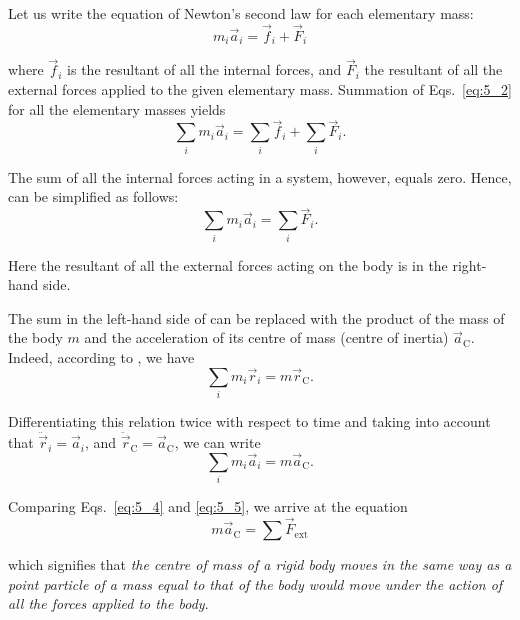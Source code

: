 Let us write the equation of Newton's second law for each elementary mass:
\begin{equation}\label{eq:5_2}
m_i\vec{a}_i = \vec{f}_i + \vec{F}_i
\end{equation}

\noindent
where $\vec{f}_i$ is the resultant of all the internal forces, and $\vec{F}_i$ the resultant of all the external forces applied to the given elementary mass. Summation of Eqs.~\eqref{eq:5_2} for all the elementary masses yields
\begin{equation}\label{eq:5_3}
	\sum_i m_i\vec{a}_i = \sum_i \vec{f}_i + \sum_i \vec{F}_i.
\end{equation}

\noindent
The sum of all the internal forces acting in a system, however, equals zero. Hence,  can be simplified as follows:
\begin{equation}\label{eq:5_4}
	\sum_i m_i\vec{a}_i = \sum_i \vec{F}_i.
\end{equation}

\noindent
Here the resultant of all the external forces acting on the body is in the right-hand side.

The sum in the left-hand side of  can be replaced with the product of the mass of the body $m$ and the acceleration of its centre of mass (centre of inertia) $\vec{a}_{\text{C}}$. Indeed, according to , we have
\begin{equation*}
	\sum_i m_i\vec{r}_i = m \vec{r}_{\text{C}}.
\end{equation*}

\noindent
Differentiating this relation twice with respect to time and taking into account that $\ddot{\vec{r}}_i=\vec{a}_i$, and $\ddot{\vec{r}}_{\text{C}}=\vec{a}_{\text{C}}$, we can write
\begin{equation}\label{eq:5_5}
	\sum_i m_i\vec{a}_i = m \vec{a}_{\text{C}}.
\end{equation}

Comparing Eqs.~\eqref{eq:5_4} and \eqref{eq:5_5}, we arrive at the equation
\begin{equation}\label{eq:5_6}
	m \vec{a}_{\text{C}} = \sum\vec{F}_{\text{ext}}
\end{equation}

\noindent
which signifies that \textit{the centre of mass of a rigid body moves in the same way as a point particle of a mass equal to that of the body would move under the action of all the forces applied to the body}.

